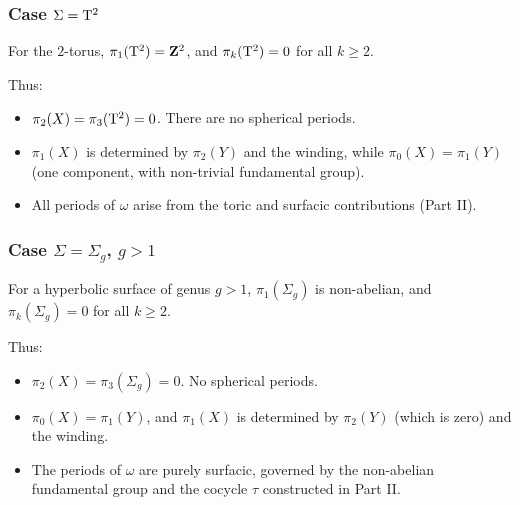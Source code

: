 \documentclass[11pt,reqno,letterpaper,twoside]{amsart}
\begin{document}
  \subsubsection{Case $\Sigma = \mathrm{T}^2$}
  
  For the $2$-torus,
  $\pi_1(\mathrm{T}^2) = {\mathbf{Z}}^2$,
  and $\pi_k(\mathrm{T}^2) = 0$ for all $k \geq 2$.
  
  Thus:
  \begin{itemize}[nosep]
    \item[--] $\pi_2(X) = \pi_3(\mathrm{T}^2) = 0$.
    There are no spherical periods.
    \item[--] $\pi_1(X)$ is determined by $\pi_2(Y)$ and the winding,
    while $\pi_0(X) = \pi_1(Y)$ (one component,
    with non-trivial fundamental group).
    \item[--] All periods of $\omega$ arise from
    the toric and surfacic contributions (Part II).
  \end{itemize}
  
  \subsubsection{Case $\Sigma = \Sigma_g$, $g > 1$}
  
  For a hyperbolic surface of genus $g > 1$,
  $\pi_1(\Sigma_g)$ is non-abelian,
  and $\pi_k(\Sigma_g) = 0$ for all $k \geq 2$.
  
  Thus:
  \begin{itemize}[nosep]
    \item[--] $\pi_2(X) = \pi_3(\Sigma_g) = 0$.
    No spherical periods.
    \item[--] $\pi_0(X) = \pi_1(Y)$,
    and $\pi_1(X)$ is determined by $\pi_2(Y)$ (which is zero)
    and the winding.
    \item[--] The periods of $\omega$ are purely surfacic,
    governed by the non-abelian fundamental group
    and the cocycle $\tau$ constructed in Part II.
  \end{itemize}
  
\end{document}
